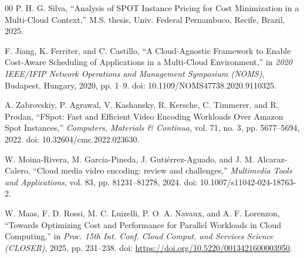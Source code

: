 \documentclass[conference]{IEEEtran}
\begin{document}
\begin{thebibliography}{00}
		 P. H. G. Silva, ``Analysis of SPOT Instance Pricing for Cost Minimization in a Multi-Cloud Context,'' M.S. thesis, Univ. Federal Pernambuco, Recife, Brazil, 2025.
		
		 F. Jiang, K. Ferriter, and C. Castillo, ``A Cloud-Agnostic Framework to Enable Cost-Aware Scheduling of Applications in a Multi-Cloud Environment,'' in \emph{2020 IEEE/IFIP Network Operations and Management Symposium (NOMS)}, Budapest, Hungary, 2020, pp. 1--9. doi: 10.1109/NOMS47738.2020.9110325.
		
		 A. Zabrovskiy, P. Agrawal, V. Kashansky, R. Kersche, C. Timmerer, and R. Prodan, ``FSpot: Fast and Efficient Video Encoding Workloads Over Amazon Spot Instances,'' \emph{Computers, Materials \& Continua}, vol. 71, no. 3, pp. 5677--5694, 2022. doi: 10.32604/cmc.2022.023630.
		
		 W. Moina-Rivera, M. Garcia-Pineda, J. Gutiérrez-Aguado, and J. M. Alcaraz-Calero, ``Cloud media video encoding: review and challenges,'' \emph{Multimedia Tools and Applications}, vol. 83, pp. 81231--81278, 2024. doi: 10.1007/s11042-024-18763-2.
		
		 W. Maas, F. D. Rossi, M. C. Luizelli, P. O. A. Navaux, and A. F. Lorenzon, ``Towards Optimizing Cost and Performance for Parallel Workloads in Cloud Computing,'' in \emph{Proc. 15th Int. Conf. Cloud Comput. and Services Science (CLOSER)}, 2025, pp. 231--238. doi: \url{https://doi.org/10.5220/0013421600003950}.
		
	\end{thebibliography}
	
	
	
	
\end{document}

